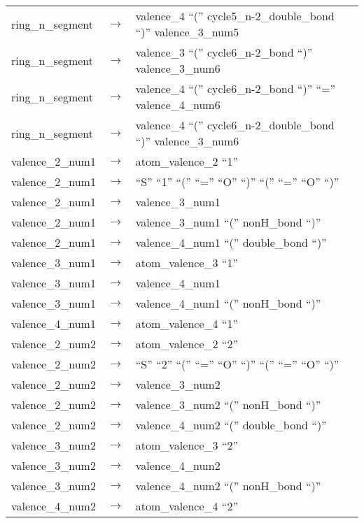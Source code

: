 \documentclass[../Document.tex]{subfiles}
\begin{document}
\begin{longtable}{m{} p{} p{}}
    ring\_n\_segment & $\rightarrow$ & valence\_4 ``('' cycle5\_n-2\_double\_bond ``)'' valence\_3\_num5 \\
    ring\_n\_segment & $\rightarrow$ & valence\_3 ``('' cycle6\_n-2\_bond ``)'' valence\_3\_num6 \\
    ring\_n\_segment & $\rightarrow$ & valence\_4 ``('' cycle6\_n-2\_bond ``)'' ``='' valence\_4\_num6 \\
    ring\_n\_segment & $\rightarrow$ & valence\_4 ``('' cycle6\_n-2\_double\_bond ``)'' valence\_3\_num6 \\
    valence\_2\_num1 & $\rightarrow$ & atom\_valence\_2 ``1'' \\
    valence\_2\_num1 & $\rightarrow$ & ``S'' ``1'' ``('' ``='' ``O'' ``)'' ``('' ``='' ``O'' ``)'' \\
    valence\_2\_num1 & $\rightarrow$ & valence\_3\_num1 \\
    valence\_2\_num1 & $\rightarrow$ & valence\_3\_num1 ``('' nonH\_bond ``)'' \\
    valence\_2\_num1 & $\rightarrow$ & valence\_4\_num1 ``('' double\_bond ``)'' \\
    valence\_3\_num1 & $\rightarrow$ & atom\_valence\_3 ``1'' \\
    valence\_3\_num1 & $\rightarrow$ & valence\_4\_num1 \\
    valence\_3\_num1 & $\rightarrow$ & valence\_4\_num1 ``('' nonH\_bond ``)'' \\
    valence\_4\_num1 & $\rightarrow$ & atom\_valence\_4 ``1'' \\
    valence\_2\_num2 & $\rightarrow$ & atom\_valence\_2 ``2'' \\
    valence\_2\_num2 & $\rightarrow$ & ``S'' ``2'' ``('' ``='' ``O'' ``)'' ``('' ``='' ``O'' ``)'' \\
    valence\_2\_num2 & $\rightarrow$ & valence\_3\_num2 \\
    valence\_2\_num2 & $\rightarrow$ & valence\_3\_num2 ``('' nonH\_bond ``)'' \\
    valence\_2\_num2 & $\rightarrow$ & valence\_4\_num2 ``('' double\_bond ``)'' \\
    valence\_3\_num2 & $\rightarrow$ & atom\_valence\_3 ``2'' \\
    valence\_3\_num2 & $\rightarrow$ & valence\_4\_num2 \\
    valence\_3\_num2 & $\rightarrow$ & valence\_4\_num2 ``('' nonH\_bond ``)'' \\
    valence\_4\_num2 & $\rightarrow$ & atom\_valence\_4 ``2'' \\

\end{longtable}
\end{document}
